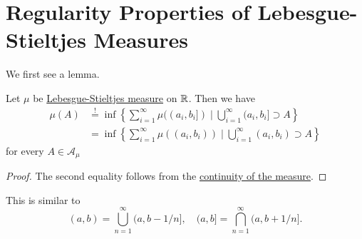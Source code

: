 \section{Regularity Properties of Lebesgue-Stieltjes Measures}
We first see a lemma.
\begin{lemma}
	Let \(\mu\) be \hyperref[def:Lebesgue-Stieltjes-measure]{Lebesgue-Stieltjes measure} on \(\mathbb{\MakeUppercase{r}} \). Then we have
	\[
		\begin{split}
			\mu (A) &\overset{\hyperref[prop:outer-measure]{!}}{=}\inf\left\{\sum\limits_{i=1}^{\infty} \mu ((a_{i}, b_{i}]) \mid \bigcup\limits_{i=1}^{\infty} (a_{i}, b_{i}]\supset A\right\}\\
			&= \inf\left\{\sum\limits_{i=1}^{\infty} \mu ((a_{i}, b_{i})) \mid \bigcup\limits_{i=1}^{\infty} (a_{i}, b_{i})\supset A\right\}
		\end{split}
	\]
	for every \(A\in \mathcal{A} _\mu \)
\end{lemma}
\begin{proof}
	The second equality follows from the \hyperref[thm:measure-space]{continuity of the measure}.
\end{proof}

\begin{remark}
	This is similar to
	\[
		(a, b) = \bigcup\limits_{n=1}^{\infty} (a, b - 1/n],\quad (a, b] = \bigcap\limits_{n=1}^{\infty} (a, b+1/n].
	\]
\end{remark}